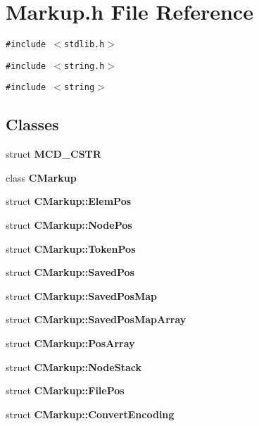 \section{Markup.h File Reference}
\label{Markup_8h}
{\tt \#include $<$stdlib.h$>$}\par
{\tt \#include $<$string.h$>$}\par
{\tt \#include $<$string$>$}\par
\subsection*{Classes}
\begin{CompactItemize}
\item 
struct {\bf MCD\_\-CSTR}
\item 
class {\bf CMarkup}
\item 
struct {\bf CMarkup::ElemPos}
\item 
struct {\bf CMarkup::NodePos}
\item 
struct {\bf CMarkup::TokenPos}
\item 
struct {\bf CMarkup::SavedPos}
\item 
struct {\bf CMarkup::SavedPosMap}
\item 
struct {\bf CMarkup::SavedPosMapArray}
\item 
struct {\bf CMarkup::PosArray}
\item 
struct {\bf CMarkup::NodeStack}
\item 
struct {\bf CMarkup::FilePos}
\item 
struct {\bf CMarkup::ConvertEncoding}
\end{CompactItemize}
